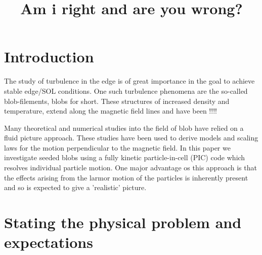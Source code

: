 \documentclass[9pt,twocolumn]{article}
\title{Am i right and are you wrong?}
\makeatletter
\renewcommand{\maketitle} %
{ \begingroup \vskip 10pt \begin{center} \large {\bf \@title}
	\vskip 10pt \large \@author \hskip 20pt \@date \end{center}
  \vskip 10pt \endgroup \setcounter{footnote}{0} }
\renewcommand{\=}[1]{\stackrel{#1}{=}} %
\theoremstyle{definition}
\theoremstyle{remark}
\makeatother
\begin{document}
\twocolumn[
  \begin{@twocolumnfalse}
    \maketitle
    \begin{abstract}
      {\lipsum[1-2]}
    \end{abstract}
  \end{@twocolumnfalse}
]
\section{Introduction}
The study of turbulence in the edge is of great importance in the goal to achieve stable edge/SOL conditions. One such turbulence phenomena are the so-called blob-filements, blobs for short. These structures of increased density and temperature, extend along the magnetic field lines and have been !!!!

Many theoretical and numerical studies into the field of blob have relied on a fluid picture approach. These studies have been used to derive models and scaling laws for the motion perpendicular to the magnetic field. In this paper we investigate seeded blobs using a fully kinetic particle-in-cell (PIC) code which resolves individual particle motion. One major advantage os this approach is that the effects arising from the larmor motion of the particles is inherently present and so is expected to give a 'realistic' picture.


\section{Stating the physical problem and expectations}
\end{document}
